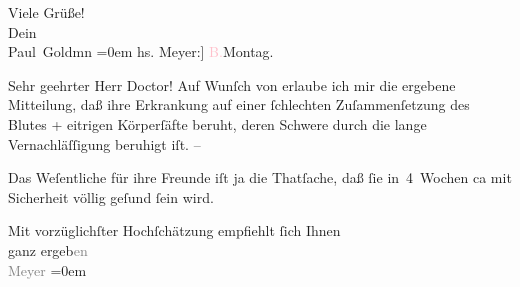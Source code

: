 \pstart
           Viele Grüße! {\\[\baselineskip]}Dein {\\[\baselineskip]}\spacefill\mbox{Paul Goldmn}\pend
           \leftskip=0em{}
\pstart
           \raggedleft{}{\pb}{[}hs. Meyer:{]} \textcolor{pink}{B.}{}\ledrightnote{\textcolor{pink}{Berlin}}{ }Montag.\pend
           
\pstart\center{}Sehr geehrter Herr Doctor!\pend
\pstart
           Auf Wunſch von \label{K_L03058-3v}\label{K_L03058-3h} erlaube ich mir die ergebene Mitteilung, daß ihre Erkrankung auf einer
               ſchlechten Zuſammenſetzung des Blutes + eitrigen Körperſäfte beruht, deren Schwere
               durch die lange Vernachläſſigung beruhigt iſt. –\pend
           
\pstart
           Das Weſentliche für {\pb}ihre Freunde iſt
               ja die Thatſache, daß ſie in 4 Wochen ca mit Sicherheit völlig geſund ſein wird.\pend
           
\pstart
           Mit vorzüglichſter Hochſchätzung empfiehlt ſich Ihnen {\\[\baselineskip]}ganz
                  ergeb\textcolor{gray}{en}{ }{\\[\baselineskip]}\spacefill\mbox{\textcolor{gray}{Meyer}}\pend
           \leftskip=0em{}\endnumbering{}
\begin{anhang}
\end{anhang}
      